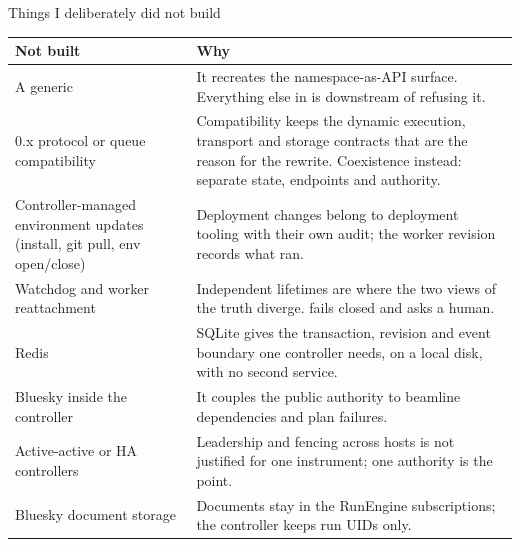 \begin{frame}{Things I deliberately did not build}
    \small
    \renewcommand{\arraystretch}{1.15}
    \begin{tabular}{@{}L{4.2cm}L{9.0cm}@{}}
        \toprule
        \textbf{Not built} & \textbf{Why} \\
        \midrule
        A generic  & It recreates the namespace-as-API surface. Everything else in \vtwo{} is downstream of refusing it. \\
        0.x protocol or queue compatibility & Compatibility keeps the dynamic execution, transport and storage contracts that are the reason for the rewrite. Coexistence instead: separate state, endpoints and authority. \\
        Controller-managed environment updates (install, git pull, env open/close) & Deployment changes belong to deployment tooling with their own audit; the worker revision records what ran. \\
        Watchdog and worker reattachment & Independent lifetimes are where the two views of the truth diverge. \vtwo{} fails closed and asks a human. \\
        Redis & SQLite gives the transaction, revision and event boundary one controller needs, on a local disk, with no second service. \\
        Bluesky inside the controller & It couples the public authority to beamline dependencies and plan failures. \\
        Active-active or HA controllers & Leadership and fencing across hosts is not justified for one instrument; one authority is the point. \\
        Bluesky document storage & Documents stay in the RunEngine subscriptions; the controller keeps run UIDs only. \\
        \bottomrule
    \end{tabular}
\end{frame}

